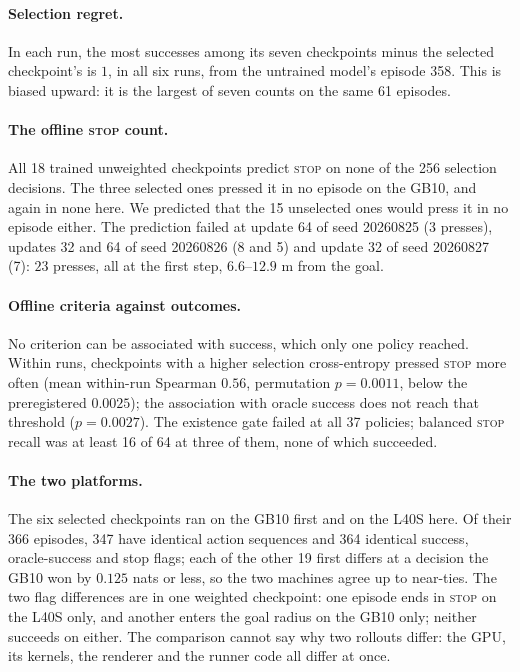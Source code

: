 \paragraph{Selection regret.}
In each run, the most successes among its seven checkpoints minus the selected checkpoint's is $1$,
in all six runs, from the untrained model's episode 358. This is biased upward: it is the largest of
seven counts on the same 61 episodes.

\paragraph{The offline \textsc{stop} count.}
All 18 trained unweighted checkpoints predict \textsc{stop} on none of the 256 selection decisions.
The three selected ones pressed it in no episode on the GB10, and again in none here. We predicted
that the 15 unselected ones would press it in no episode either. The prediction failed at update 64
of seed 20260825 (3 presses), updates 32 and 64 of seed 20260826 (8 and 5) and update 32 of seed
20260827 (7): $23$ presses, all at the first step, $6.6$--$12.9$ m from the goal.

\paragraph{Offline criteria against outcomes.}
No criterion can be associated with success, which only one policy reached. Within runs, checkpoints
with a higher selection cross-entropy pressed \textsc{stop} more often (mean within-run Spearman
$0.56$, permutation $p=0.0011$, below the preregistered $0.0025$); the association with oracle
success does not reach that threshold ($p=0.0027$). The existence gate failed at all 37 policies; balanced \textsc{stop}
recall was at least 16 of 64 at three of them, none of which succeeded.

\paragraph{The two platforms.}
The six selected checkpoints ran on the GB10 first and on the L40S here. Of their 366 episodes, 347
have identical action sequences and 364 identical success, oracle-success and stop flags; each of
the other 19 first differs at a decision the GB10 won by $0.125$ nats or less, so the two machines
agree up to near-ties. The two flag differences are in one weighted checkpoint: one episode ends in
\textsc{stop} on the L40S only, and another enters the goal radius on the GB10 only; neither succeeds
on either. The comparison cannot say why two rollouts differ: the GPU, its kernels, the renderer and
the runner code all differ at once.

